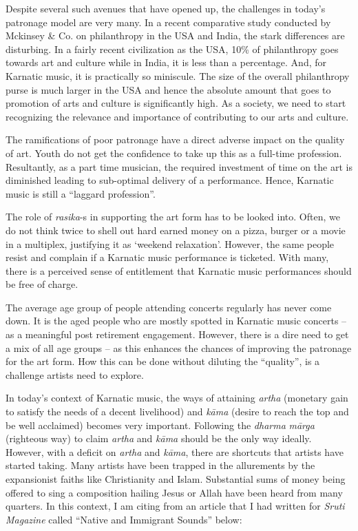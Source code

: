 Despite several such avenues that have opened up, the challenges in today’s patronage model are very many. In a recent comparative study conducted by Mckinsey \& Co. on philanthropy in the USA and India, the stark differences are disturbing. In a fairly recent civilization as the USA, 10\% of philanthropy goes towards art and culture while in India, it is less than a percentage. And, for Karnatic music, it is practically so miniscule. The size of the overall philanthropy purse is much larger in the USA and hence the absolute amount that goes to promotion of arts and culture is significantly high. As a society, we need to start recognizing the relevance and importance of contributing to our arts and culture.

\newpage

The ramifications of poor patronage have a direct adverse impact on the quality of art. Youth do not get the confidence to take up this as a full-time profession. Resultantly, as a part time musician, the required investment of time on the art is diminished leading to sub-optimal delivery of a performance. Hence, Karnatic music is still a “laggard profession”.

The role of \textit{rasika}-s in supporting the art form has to be looked into. Often, we do not think twice to shell out hard earned money on a pizza, burger or a movie in a multiplex, justifying it as ‘weekend relaxation'. However, the same people resist and complain if a Karnatic music performance is ticketed. With many, there is a perceived sense of entitlement that Karnatic music performances should be free of charge.

The average age group of people attending concerts regularly has never come down. It is the aged people who are mostly spotted in Karnatic music concerts – as a meaningful post retirement engagement. However, there is a dire need to get a mix of all age groups – as this enhances the chances of improving the patronage for the art form. How this can be done without diluting the “quality”, is a challenge artists need to explore.

In today’s context of Karnatic music, the ways of attaining \textit{artha} (monetary gain to satisfy the needs of a decent livelihood) and \textit{kāma} (desire to reach the top and be well acclaimed) becomes very important. Following the \textit{dharma} \textit{mārga} (righteous way) to claim \textit{artha} and \textit{kāma} should be the only way ideally. However, with a deficit on \textit{artha} and \textit{kāma}, there are shortcuts that artists have started taking. Many artists have been trapped in the allurements by the expansionist faiths like Christianity and Islam. Substantial sums of money being offered to sing a composition hailing Jesus or Allah have been heard from many quarters. In this context, I am citing from an article that I had written for \textit{Sruti Magazine} called “Native and Immigrant Sounds” below:

